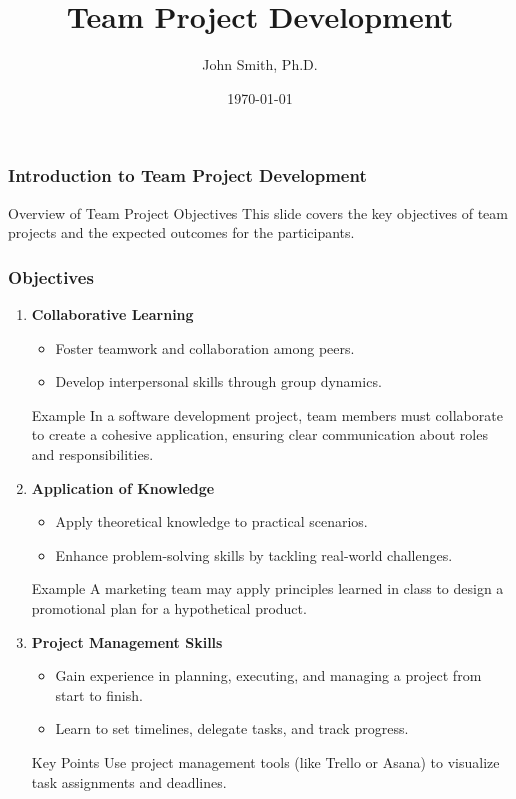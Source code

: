\documentclass[aspectratio=169]{beamer}
\title[Team Project Development]{Team Project Development}
\author[J. Smith]{John Smith, Ph.D.}
\institute[University Name]{
  Department of Computer Science\\
  University Name\\
  \vspace{0.3cm}
  Email: email@university.edu\\
  Website: www.university.edu
}
\date{\today}
\begin{document}
\frame{\titlepage}

\begin{frame}[fragile]
    \frametitle{Introduction to Team Project Development}
    \begin{block}{Overview of Team Project Objectives}
        This slide covers the key objectives of team projects and the expected outcomes for the participants.
    \end{block}
\end{frame}

\begin{frame}[fragile]
    \frametitle{Objectives}
    \begin{enumerate}
        \item \textbf{Collaborative Learning} 
        \begin{itemize}
            \item Foster teamwork and collaboration among peers.
            \item Develop interpersonal skills through group dynamics.
        \end{itemize}
        \begin{block}{Example}
            In a software development project, team members must collaborate to create a cohesive application, ensuring clear communication about roles and responsibilities.
        \end{block}

        \item \textbf{Application of Knowledge}
        \begin{itemize}
            \item Apply theoretical knowledge to practical scenarios.
            \item Enhance problem-solving skills by tackling real-world challenges.
        \end{itemize}
        \begin{block}{Example}
            A marketing team may apply principles learned in class to design a promotional plan for a hypothetical product.
        \end{block}

        \item \textbf{Project Management Skills}
        \begin{itemize}
            \item Gain experience in planning, executing, and managing a project from start to finish.
            \item Learn to set timelines, delegate tasks, and track progress.
        \end{itemize}
        \begin{block}{Key Points}
            Use project management tools (like Trello or Asana) to visualize task assignments and deadlines.
        \end{block}
    \end{enumerate}
\end{frame}
\end{document}
